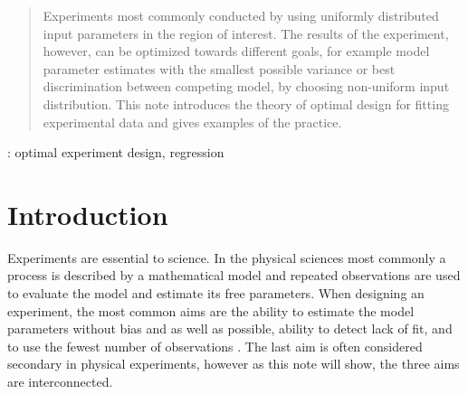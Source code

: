 \documentclass[12pt]{iopart}
\begin{document}
\address{Institute of Atomic and Molecular Sciences, Academia Sinica, Taiwan}
\begin{abstract}
Experiments most commonly conducted by using uniformly distributed input parameters in the region of interest. The results of the experiment, however, can be optimized towards different goals, for example model parameter estimates with the smallest possible variance or best discrimination between competing model, by choosing non-uniform input distribution. This note introduces the theory of optimal design for fitting experimental data and gives examples of the practice.
\end{abstract}

: optimal experiment design, regression




\section{Introduction}


Experiments are essential to science. In the physical sciences most commonly a process is described by a mathematical model and repeated observations are used to evaluate the model and estimate its free parameters. When designing an experiment, the most common aims are the ability to estimate the model parameters without bias and as well as possible, ability to detect lack of fit, and to use the fewest number of observations \cite{Box1975,Box1987}. The last aim is often considered secondary in physical experiments, however as this note will show, the three aims are interconnected.
\end{document}
